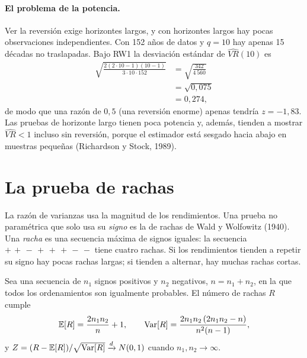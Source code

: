 \paragraph{El problema de la potencia.} Ver la reversión exige horizontes largos, y con horizontes largos hay
pocas observaciones independientes. Con 152 años de datos y $q=10$ hay apenas 15 décadas no traslapadas. Bajo
RW1 la desviación estándar de $\widehat{VR}(10)$ es
\begin{align*}
  \sqrt{\frac{2(2\cdot10-1)(10-1)}{3\cdot10\cdot152}}
    &= \sqrt{\frac{342}{4\,560}}\\
    &= \sqrt{0{,}075}\\
    &= 0{,}274,
\end{align*}
de modo que una razón de $0{,}5$ (una reversión enorme) apenas tendría $z=-1{,}83$. Las pruebas de horizonte
largo tienen poca potencia y, además, tienden a mostrar $\widehat{VR}<1$ incluso sin reversión, porque el
estimador está sesgado hacia abajo en muestras pequeñas (Richardson y Stock, 1989).

\section{La prueba de rachas}

La razón de varianzas usa la magnitud de los rendimientos. Una prueba no paramétrica que solo usa su
\emph{signo} es la de rachas de Wald y Wolfowitz (1940). Una \emph{racha} es una secuencia máxima de signos
iguales: la secuencia $+\,+\,-\,+\,+\,+\,-\,-$ tiene cuatro rachas. Si los rendimientos tienden a repetir su
signo hay pocas rachas largas; si tienden a alternar, hay muchas rachas cortas.

\begin{proposicion}\label{prop:rachas}
Sea una secuencia de $n_1$ signos positivos y $n_2$ negativos, $n=n_1+n_2$, en la que todos los ordenamientos
son igualmente probables. El número de rachas $R$ cumple
\[
  \mathbb{E}[R]=\frac{2n_1n_2}{n}+1,\qquad
  \operatorname{Var}[R]=\frac{2n_1n_2\,(2n_1n_2-n)}{n^2(n-1)},
\]
y $Z=(R-\mathbb{E}[R])/\sqrt{\operatorname{Var}[R]}\xrightarrow{d}N(0,1)$ cuando $n_1,n_2\to\infty$.
\end{proposicion}

